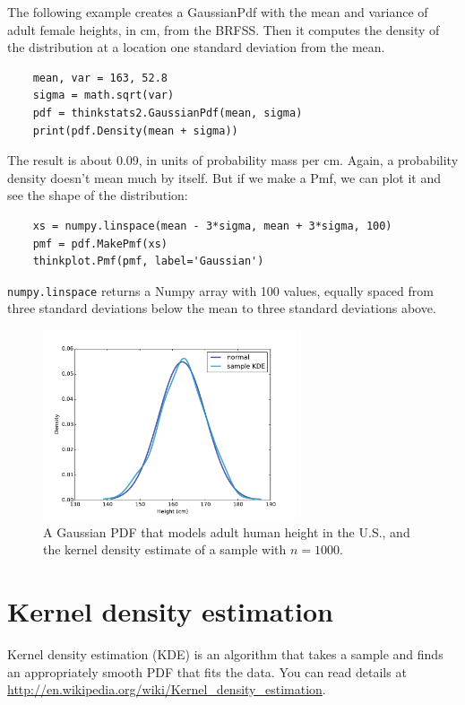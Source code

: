 \documentclass[12pt]{book}
\begin{document}
The following example creates a GaussianPdf with the mean and variance
of adult female heights, in cm, from the BRFSS.  Then it computes the
density of the distribution at a location one standard deviation from
the mean.

\begin{verbatim}
    mean, var = 163, 52.8
    sigma = math.sqrt(var)
    pdf = thinkstats2.GaussianPdf(mean, sigma)
    print(pdf.Density(mean + sigma))
\end{verbatim}

The result is about 0.09, in units of probability mass per cm.
Again, a probability density doesn't mean much by itself.  But if
we make a Pmf, we can plot it and see the shape of the distribution:

\begin{verbatim}
    xs = numpy.linspace(mean - 3*sigma, mean + 3*sigma, 100)
    pmf = pdf.MakePmf(xs)
    thinkplot.Pmf(pmf, label='Gaussian')
\end{verbatim}

{\tt numpy.linspace} returns a Numpy array with 100 values, equally
spaced from three standard deviations below the mean to three standard
deviations above.

\begin{figure}
\centerline{\includegraphics[height=2.2in]{figs/pdf_example.pdf}}
\caption{A Gaussian PDF that models adult human height in the U.S.,
and the kernel density estimate of a sample with $n=1000$.}
\label{pdf_example}
\end{figure}


\section{Kernel density estimation} 

Kernel density estimation (KDE) is an algorithm that takes
a sample and finds an appropriately smooth PDF that fits 
the data.  You can read details at
\url{http://en.wikipedia.org/wiki/Kernel_density_estimation}.
\end{document}
